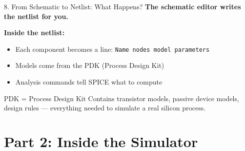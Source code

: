 \documentclass[aspectratio=169, 11pt]{beamer}
\begin{document}
\begin{frame}{8. From Schematic to Netlist: What Happens?}
    \textbf{The schematic editor writes the netlist for you.}

    \vspace{0.5em}
    \begin{center}
    \end{center}

    \vspace{0.5em}
    \textbf{Inside the netlist:}
    \begin{itemize}
        \item Each component becomes a line: \texttt{Name nodes model parameters}
        \item Models come from the PDK (Process Design Kit)
        \item Analysis commands tell SPICE what to compute
    \end{itemize}

    \vspace{0.5em}
    \begin{block}{PDK = Process Design Kit}
        Contains transistor models, passive device models, design rules — everything needed to simulate a real silicon process.
    \end{block}
\end{frame}


\section{Part 2: Inside the Simulator}
\end{document}

